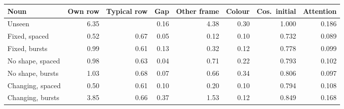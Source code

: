 \begin{tabular}{@{}lrrrrrrr@{}}
\toprule
Noun & Own row & Typical row & Gap & Other frame & Colour & Cos.\ initial & Attention \\
\midrule
Unseen & 6.35 &  & 0.16 & 4.38 & \textminus{}0.30 & 1.000 & 0.186 \\
Fixed, spaced & 0.52 & 0.67 & 0.05 & 0.12 & \textminus{}0.10 & 0.732 & 0.089 \\
Fixed, bursts & 0.99 & 0.61 & 0.13 & 0.32 & \textminus{}0.12 & 0.778 & 0.099 \\
No shape, spaced & 0.98 & 0.63 & \textminus{}0.04 & 0.71 & \textminus{}0.22 & 0.793 & 0.102 \\
No shape, bursts & 1.03 & 0.68 & \textminus{}0.07 & 0.66 & \textminus{}0.34 & 0.806 & 0.097 \\
Changing, spaced & 0.50 & 0.61 & 0.10 & 0.20 & \textminus{}0.10 & 0.794 & 0.108 \\
Changing, bursts & 3.85 & 0.66 & 0.37 & 1.53 & \textminus{}0.12 & 0.849 & 0.168 \\
\bottomrule
\end{tabular}

